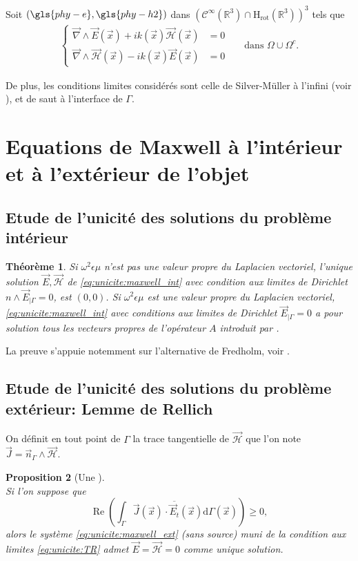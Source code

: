 \documentclass[12pt,%
    twoside,%
    a4paper,%
    openright, %
    ]{book}
\numberwithin{equation}{section} %
\newtheorem{thm}{Théorème}[chapter] %
\newtheorem{prop}[thm]{Proposition}
\newcommand{\pvect}{\wedge}
\newcommand{\vect}[1]{{\overset{\rightarrow}{#1}}}
\newcommand{\conj}[1]{{\overline{#1}}}
\newcommand{\w}{\omega}
\newcommand{\RR}{\mathbb R}
\newcommand{\eps}{\epsilon}
\newcommand{\dd}{\mathrm{d}}
\newcommand{\OO}{\Omega}
\newcommand{\Sobdw}[1][{}]{\mathrm{H}_\mathrm{#1}}
\newcommand{\Hrot}{\Sobdw[rot]}
\renewcommand{\Re}{\operatorname{Re}}
\newcommand{\vE}{\vect{E}}
\newcommand{\cH}{\mathcal{H}}
\newcommand{\vH}{\vect{\cH}}
\newcommand{\vn}{\vect{n}}
\newcommand{\vx}{\vect{x}}
\newcommand{\vJ}{\vect{J}}
\newcommand{\vrot}{\vect{\nabla}\pvect}
\begin{document}
Soit \((\gls{phy-e},\gls{phy-h2})\) dans \((\mathcal{C}^\infty(\RR^3)\cap\Hrot(\RR^3))^3\) tels que
\begin{align}
  \left\lbrace
  \begin{matrix}
    \vrot \vE(\vx) + i k(\vx) \vH(\vx) &= 0
    \\
    \vrot \vH(\vx) - i k(\vx) \vE(\vx) &= 0
  \end{matrix}
  \right. && \text{dans \(\OO\cup\OO^c\).}
  \label{eq:unicite:maxwell_ext}
\end{align}

De plus, les conditions limites considérés sont celle de Silver-Müller à l'infini (voir \cite[eq (5.2.24), p.~183]{nedelec_acoustic_2001}), et de saut à l'interface de \(\Gamma\).

\section{Equations de Maxwell à l'intérieur et à l'extérieur de l'objet}

  \subsection{Etude de l'unicité des solutions du problème intérieur}

    \begin{thm}
      Si \(\w^2\eps\mu\) n'est pas une valeur propre du Laplacien vectoriel, l'unique solution \(\vE,\vH\) de \eqref{eq:unicite:maxwell_int} avec condition aux limites de Dirichlet \(n\wedge \vE_{|\Gamma} = 0\),  est \((0,0)\).
      Si \(\w^2\eps\mu\) est une valeur propre du Laplacien vectoriel, \eqref{eq:unicite:maxwell_int} avec conditions aux limites de Dirichlet \(\vE_{|\Gamma} = 0\) a pour solution tous les vecteurs propres de l'opérateur \(A\) introduit par \cite[eq.~(133), p.~58]{cessenat_mathematical_1996}.
    \end{thm}
    La preuve s'appuie notemment sur l'alternative de Fredholm, voir \cite[Théorème~8, p.~111]{cessenat_mathematical_1996}.

  \subsection{Etude de l'unicité des solutions du problème extérieur: Lemme de Rellich}

    On définit en tout point de \(\Gamma\) la trace tangentielle de \(\vH\) que l'on note \(\vJ = \vn_\Gamma \pvect \vH\).
    \begin{prop}[Une ]~\\
      Si l'on suppose que
      \begin{equation}
        \label{prop:cgu}
        \Re\left(\int_\Gamma \vJ(\vx) \cdot \conj{\vE_t}(\vx) \dd{\Gamma(\vx)}\right) \ge 0,
      \end{equation}
      alors le système \eqref{eq:unicite:maxwell_ext} (sans source) muni de la condition aux limites \eqref{eq:unicite:TR} admet \(\vE=\vH=0\) comme unique solution.
    \end{prop}
    
\end{document}
